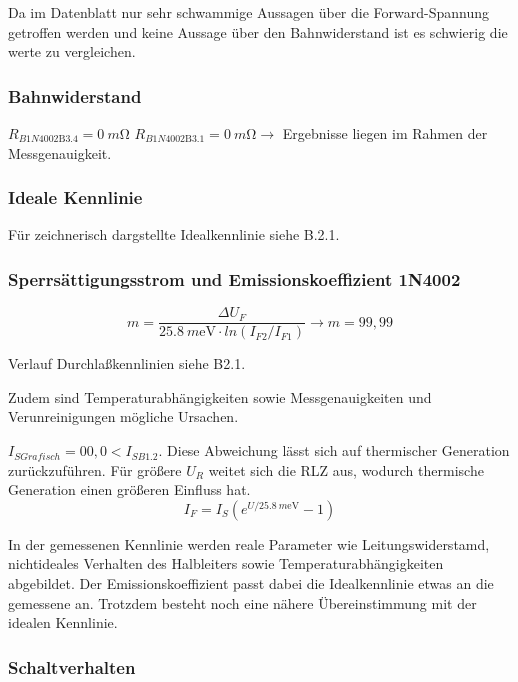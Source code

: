 \documentclass[
	a4paper, %
	12pt, %
]{CSUniSchoolLabReport}
\newcommand{\milli}{m}
\begin{document}
Da im Datenblatt nur sehr schwammige Aussagen über die Forward-Spannung getroffen werden und keine Aussage über den Bahnwiderstand ist es schwierig die werte zu vergleichen.

\subsubsection{Bahnwiderstand}
$R_{B1N4002\text{B3.4}} = \SI{0}{\milli\ohm}$ $R_{B1N4002\text{B3.1}} = \SI{0}{\milli\ohm}\rightarrow $ Ergebnisse liegen im Rahmen der Messgenauigkeit. 
\subsubsection{Ideale Kennlinie}
Für zeichnerisch dargstellte Idealkennlinie siehe B.2.1.
\subsubsection{Sperrsättigungsstrom und Emissionskoeffizient 1N4002}
\vspace{1em} 
\[
m = \frac{\Delta U_F}{\SI{25.8}{\milli\electronvolt}\cdot ln(I_{F2}/I_{F1})} \rightarrow m = 99,99
\]
\vspace{1em}

Verlauf Durchlaßkennlinien siehe B2.1. 



Zudem sind Temperaturabhängigkeiten sowie Messgenauigkeiten und Verunreinigungen mögliche Ursachen. 

$I_{S Grafisch} = 00,0 < I_{S B1.2}$. Diese Abweichung lässt sich auf thermischer Generation zurückzuführen. Für größere $U_R$ weitet sich die RLZ aus, wodurch thermische Generation einen größeren Einfluss hat. 
\[
I_F = I_S(e^{U/\SI{25.8}{\milli\electronvolt}}-1)
\]

In der gemessenen Kennlinie werden reale Parameter wie Leitungswiderstamd, nichtideales Verhalten des Halbleiters sowie Temperaturabhängigkeiten abgebildet.
Der Emissionskoeffizient passt dabei die Idealkennlinie etwas an die gemessene an. Trotzdem besteht noch eine nähere Übereinstimmung mit der idealen Kennlinie.

\subsubsection{Schaltverhalten}
\end{document}
